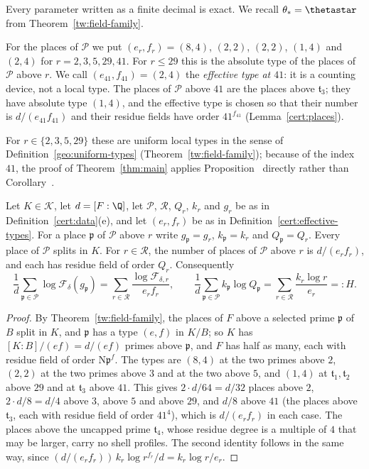 Every parameter written as a finite decimal is exact. We recall
$\theta_*=\thetastar$ from Theorem~\ref{tw:field-family}.

\begin{definition}\label{cert:effective-types}
For the places of $\mathcal P$ we put $(e_r,f_r)=(8,4)$, $(2,2)$, $(2,2)$,
$(1,4)$ and $(2,4)$ for $r=2,3,5,29,41$. For $r\le29$ this is the absolute
type of the places of $\mathcal P$ above $r$. We call $(e_{41},f_{41})=(2,4)$
the \emph{effective type at $41$}: it is a counting device, not a local type.
The places of $\mathcal P$ above $41$ are the places above $\mathfrak t_3$;
they have absolute type $(1,4)$, and the effective type is chosen so that
their number is $d/(e_{41}f_{41})$ and their residue fields have order
$41^{f_{41}}$ (Lemma~\ref{cert:places}).
\end{definition}

For $r\in\{2,3,5,29\}$ these are uniform local types in the sense of
Definition~\ref{geo:uniform-types} (Theorem~\ref{tw:field-family}); because of
the index $41$, the proof of Theorem~\ref{thm:main} applies
Proposition~ directly rather than
Corollary~.

\begin{lemma}\label{cert:places}
Let $K\in\mathcal K$, let $d=[F:\Q]$, let $\mathcal P$, $\mathcal R$, $Q_r$,
$k_r$ and $g_r$ be as in Definition~\ref{cert:data}(e), and let $(e_r,f_r)$ be
as in Definition~\ref{cert:effective-types}. For a place $\mathfrak p$ of
$\mathcal P$ above $r$ write $g_{\mathfrak p}=g_r$, $k_{\mathfrak p}=k_r$ and
$Q_{\mathfrak p}=Q_r$. Every place of $\mathcal P$ splits
in $K$. For $r\in\mathcal R$, the number of places of $\mathcal P$ above $r$
is $d/(e_rf_r)$, and each has residue field of order $Q_r$. Consequently
\[
 \frac1d\sum_{\mathfrak p\in\mathcal P}\log\mathcal F_\delta(g_{\mathfrak p})
 =\sum_{r\in\mathcal R}\frac{\log\mathcal F_{\delta,r}}{e_rf_r},\qquad
 \frac1d\sum_{\mathfrak p\in\mathcal P}k_{\mathfrak p}\log Q_{\mathfrak p}
 =\sum_{r\in\mathcal R}\frac{k_r\log r}{e_r}=:H.
\]
\end{lemma}

\begin{proof}
By Theorem~\ref{tw:field-family}, the places of $F$ above a selected prime
$\mathfrak p$ of $B$ split in $K$, and $\mathfrak p$ has a type $(e,f)$ in
$K/B$; so $K$ has $[K:B]/(ef)=d/(ef)$ primes above $\mathfrak p$, and $F$ has
half as many, each with residue field of order $\mathrm N\mathfrak p^f$. The
types are $(8,4)$ at the two primes above $2$, $(2,2)$ at the two primes above
$3$ and at the two above $5$, and $(1,4)$ at $\mathfrak t_1,\mathfrak t_2$
above $29$ and at $\mathfrak t_3$ above $41$. This gives $2\cdot d/64=d/32$
places above $2$, $2\cdot d/8=d/4$ above $3$, above $5$ and above $29$, and
$d/8$ above $41$ (the places above $\mathfrak t_3$, each with residue field
of order $41^4$), which is $d/(e_rf_r)$ in each case. The places above the
uncapped prime $\mathfrak t_4$, whose residue degree is a multiple of $4$
that may be larger, carry no shell profiles. The
second identity follows in the same way, since
$(d/(e_rf_r))\,k_r\log r^{f_r}/d=k_r\log r/e_r$.
\end{proof}

